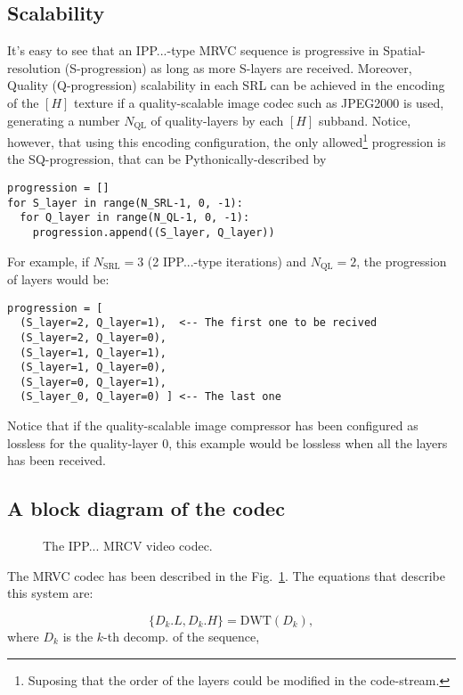 \subsection{Scalability}
It's easy to see that an IPP...-type MRVC sequence is progressive in
Spatial-resolution (S-progression) as long as more S-layers are
received. Moreover, Quality (Q-progression) scalability in each SRL
can be achieved in the encoding of the $[H]$ texture if a
quality-scalable image codec such as JPEG2000 is used, generating a
number $N_{\text{QL}}$ of quality-layers by each $[H]$
subband. Notice, however, that using this encoding configuration, the
only allowed\footnote{Suposing that the order of the layers could be
modified in the code-stream.} progression is the SQ-progression, that
can be Pythonically-described by
\begin{verbatim}
progression = []
for S_layer in range(N_SRL-1, 0, -1):
  for Q_layer in range(N_QL-1, 0, -1):
    progression.append((S_layer, Q_layer))
\end{verbatim}

For example, if $N_{\text{SRL}}=3$ (2 IPP...-type iterations) and
$N_{\text{QL}}=2$, the progression of layers would be:
\begin{verbatim}
progression = [
  (S_layer=2, Q_layer=1),  <-- The first one to be recived
  (S_layer=2, Q_layer=0),
  (S_layer=1, Q_layer=1),
  (S_layer=1, Q_layer=0),
  (S_layer=0, Q_layer=1),
  (S_layer_0, Q_layer=0) ] <-- The last one
\end{verbatim}
Notice that if the quality-scalable image compressor has been
configured as lossless for the quality-layer 0, this example
would be lossless when all the layers has been received.

\subsection{A block diagram of the codec}
\begin{figure}
  \centering
  \caption{The IPP... MRCV video codec.}
  \label{fig:codec}
\end{figure}

The MRVC codec has been described in the Fig.~\ref{fig:codec}. The
equations that describe this system are:

\begin{equation}
  \{D_k.L, D_k.H\} = \text{DWT}(D_k),
  \tag{a}
\end{equation}
where $D_k$ is the $k$-th decomp. of the sequence,

